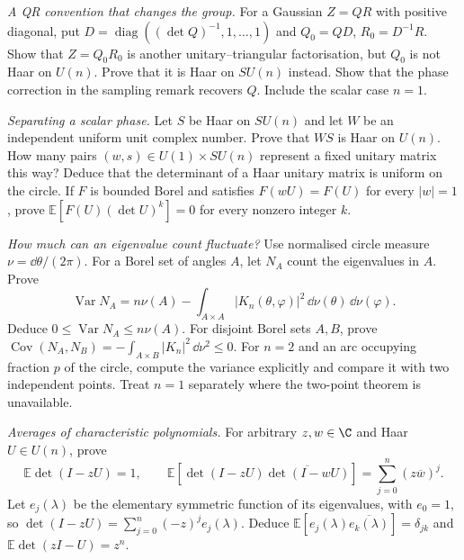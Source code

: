 \begin{exercise}[$\star\star$]\label{ex:v9-qr-phase-counterexample}
\emph{A QR convention that changes the group.}
For a Gaussian $Z=QR$ with positive diagonal, put
$D=\operatorname{diag}((\det Q)^{-1},1,\ldots,1)$ and
$Q_0=QD$, $R_0=D^{-1}R$.
Show that $Z=Q_0R_0$ is another unitary--triangular factorisation, but
$Q_0$ is not Haar on $U(n)$. Prove that it is Haar on $SU(n)$ instead.
Show that the phase correction in the sampling remark recovers $Q$.
Include the scalar case $n=1$.
\end{exercise}
\begin{exercise}[$\star\star$]\label{ex:v9-determinant-sampling}
\emph{Separating a scalar phase.}
Let $S$ be Haar on $SU(n)$ and let $W$ be an independent uniform unit
complex number. Prove that $WS$ is Haar on $U(n)$.
How many pairs $(w,s)\in U(1)\times SU(n)$ represent a fixed unitary
matrix this way? Deduce that the determinant of a Haar unitary matrix
is uniform on the circle.
If $F$ is bounded Borel and satisfies $F(wU)=F(U)$ for every $|w|=1$,
prove $\mathbb E[F(U)(\det U)^k]=0$ for every nonzero integer $k$.
\end{exercise}
\begin{exercise}[$\star\star$]\label{ex:v9-arc-variance}
\emph{How much can an eigenvalue count fluctuate?}
Use normalised circle measure $\nu=\dd\theta/(2\pi)$.
For a Borel set of angles $A$, let $N_A$ count the eigenvalues in $A$.
Prove
\[
 \operatorname{Var}N_A=n\nu(A)-\int_{A\times A}|K_n(\theta,\varphi)|^2
                                      \,\dd\nu(\theta)\,\dd\nu(\varphi).
\]
Deduce $0\le\operatorname{Var}N_A\le n\nu(A)$.
For disjoint Borel sets $A,B$, prove
$\operatorname{Cov}(N_A,N_B)=-\int_{A\times B}|K_n|^2\,\dd\nu^2\le0$.
For $n=2$ and an arc occupying fraction $p$ of the circle, compute the
variance explicitly and compare it with two independent points.
Treat $n=1$ separately where the two-point theorem is unavailable.
\end{exercise}
\begin{exercise}[$\star\star$]\label{ex:v9-characteristic-polynomials}
\emph{Averages of characteristic polynomials.}
For arbitrary $z,w\in\C$ and Haar $U\in U(n)$, prove
\[
 \mathbb E\det(I-zU)=1,\qquad
 \mathbb E\left[\det(I-zU)\overline{\det(I-wU)}\right]
       =\sum_{j=0}^n(z\overline w)^j.
\]
Let $e_j(\lambda)$ be the elementary symmetric function of its eigenvalues,
with $e_0=1$, so $\det(I-zU)=\sum_{j=0}^n(-z)^je_j(\lambda)$.
Deduce $\mathbb E[e_j(\lambda)\overline{e_k(\lambda)}]=\delta_{jk}$
and $\mathbb E\det(zI-U)=z^n$.
\end{exercise}


